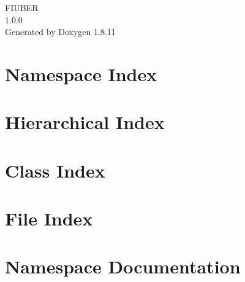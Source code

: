 \documentclass[twoside]{book}
\newcommand{\+}{\discretionary{\mbox{\scriptsize$\hookleftarrow$}}{}{}}
\newcommand{\clearemptydoublepage}{%
  \newpage{\pagestyle{empty}\cleardoublepage}%
}
\begin{document}
\hypersetup{pageanchor=false,
             bookmarksnumbered=true,
             pdfencoding=unicode
            }
\begin{titlepage}
\vspace*{7cm}
\begin{center}%
{\Large F\+I\+U\+B\+ER \\[1ex]\large 1.\+0.\+0 }\\
\vspace*{1cm}
{\large Generated by Doxygen 1.8.11}\\
\end{center}
\end{titlepage}
\clearemptydoublepage
\tableofcontents
\clearemptydoublepage
{}
\hypersetup{pageanchor=true}

\chapter{Namespace Index}

\chapter{Hierarchical Index}

\chapter{Class Index}

\chapter{File Index}

\chapter{Namespace Documentation}



















\end{document}
